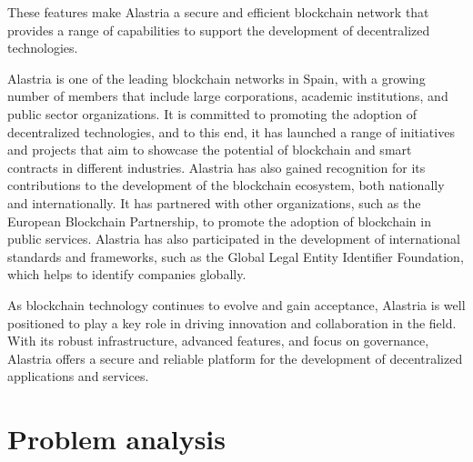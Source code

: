 \documentclass[target=mst,aauheader=]{thud}
\begin{document}
    These features make Alastria a secure and efficient blockchain network that provides a range of capabilities to support the development of decentralized technologies.\par

    Alastria is one of the leading blockchain networks in Spain, with a growing number of members that include large corporations, academic institutions, and public sector organizations. It is committed to promoting the adoption of decentralized technologies, and to this end, it has launched a range of initiatives and projects that aim to showcase the potential of blockchain and smart contracts in different industries.
    Alastria has also gained recognition for its contributions to the development of the blockchain ecosystem, both nationally and internationally. It has partnered with other organizations, such as the European Blockchain Partnership, to promote the adoption of blockchain in public services. Alastria has also participated in the development of international standards and frameworks, such as the Global Legal Entity Identifier Foundation, which helps to identify companies globally.\par
    As blockchain technology continues to evolve and gain acceptance, Alastria is well positioned to play a key role in driving innovation and collaboration in the field. With its robust infrastructure, advanced features, and focus on governance, Alastria offers a secure and reliable platform for the development of decentralized applications and services.

\chapter{Problem analysis}
\label{problemAnalysis}
\end{document}
